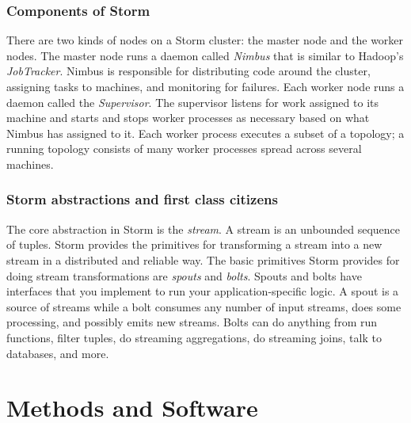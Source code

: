 \documentclass[11pt]{article}
\begin{document}
\subsubsection{Components of Storm}
There are two kinds of nodes on a Storm cluster: the master node and the worker nodes. The master node runs a daemon called \emph{Nimbus} that is similar to Hadoop's \emph{JobTracker}. Nimbus is responsible for distributing code around the cluster, assigning tasks to machines, and monitoring for failures. Each worker node runs a daemon called the \emph{Supervisor}. The supervisor listens for work assigned to its machine and starts and stops worker processes as necessary based on what Nimbus has assigned to it. Each worker process executes a subset of a topology; a running topology consists of many worker processes spread across several machines. 

\subsubsection{Storm abstractions and first class citizens}
The core abstraction in Storm is the \emph{stream}. A stream is an unbounded sequence of tuples. Storm provides the primitives for transforming a stream into a new stream in a distributed and reliable way. The basic primitives Storm provides for doing stream transformations are \emph{spouts} and \emph{bolts}. Spouts and bolts have interfaces that you implement to run your application-specific logic. A spout is a source of streams while a bolt consumes any number of input streams, does some processing, and possibly emits new streams. Bolts can do anything from run functions, filter tuples, do streaming aggregations, do streaming joins, talk to databases, and more.

\section{Methods and Software}
\end{document}
